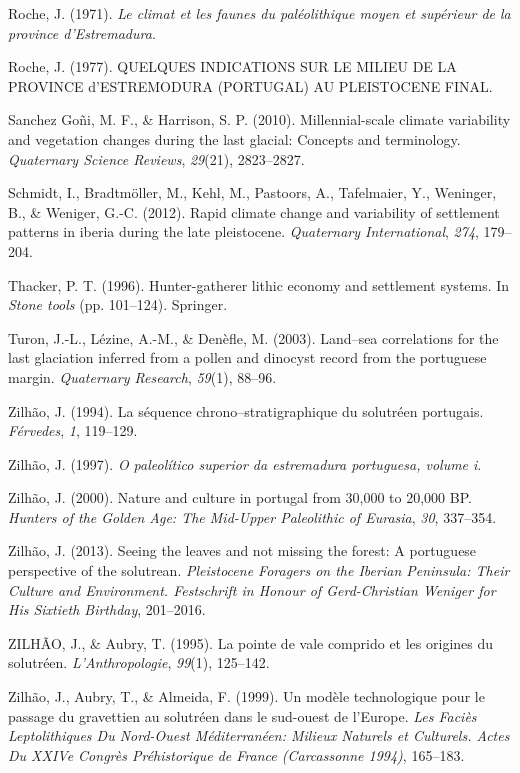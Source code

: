 \documentclass[12pt,twoside]{reedthesis}
\begin{document}
\leavevmode\hypertarget{ref-roche1971}{}%
Roche, J. (1971). \emph{Le climat et les faunes du paléolithique moyen et supérieur de la province d'Estremadura}.

\leavevmode\hypertarget{ref-roche1977}{}%
Roche, J. (1977). QUELQUES INDICATIONS SUR LE MILIEU DE LA PROVINCE d'ESTREMODURA (PORTUGAL) AU PLEISTOCENE FINAL.

\leavevmode\hypertarget{ref-sanchez-goni2010}{}%
Sanchez Goñi, M. F., \& Harrison, S. P. (2010). Millennial-scale climate variability and vegetation changes during the last glacial: Concepts and terminology. \emph{Quaternary Science Reviews}, \emph{29}(21), 2823--2827.

\leavevmode\hypertarget{ref-schmidt2012}{}%
Schmidt, I., Bradtmöller, M., Kehl, M., Pastoors, A., Tafelmaier, Y., Weninger, B., \& Weniger, G.-C. (2012). Rapid climate change and variability of settlement patterns in iberia during the late pleistocene. \emph{Quaternary International}, \emph{274}, 179--204.

\leavevmode\hypertarget{ref-thacker1996}{}%
Thacker, P. T. (1996). Hunter-gatherer lithic economy and settlement systems. In \emph{Stone tools} (pp. 101--124). Springer.

\leavevmode\hypertarget{ref-turon2003}{}%
Turon, J.-L., Lézine, A.-M., \& Denèfle, M. (2003). Land--sea correlations for the last glaciation inferred from a pollen and dinocyst record from the portuguese margin. \emph{Quaternary Research}, \emph{59}(1), 88--96.

\leavevmode\hypertarget{ref-zilhao1994}{}%
Zilhão, J. (1994). La séquence chrono--stratigraphique du solutréen portugais. \emph{Férvedes}, \emph{1}, 119--129.

\leavevmode\hypertarget{ref-zilhao1997}{}%
Zilhão, J. (1997). \emph{O paleolítico superior da estremadura portuguesa, volume i}.

\leavevmode\hypertarget{ref-zilhao2000}{}%
Zilhão, J. (2000). Nature and culture in portugal from 30,000 to 20,000 BP. \emph{Hunters of the Golden Age: The Mid-Upper Paleolithic of Eurasia}, \emph{30}, 337--354.

\leavevmode\hypertarget{ref-zilhao2013}{}%
Zilhão, J. (2013). Seeing the leaves and not missing the forest: A portuguese perspective of the solutrean. \emph{Pleistocene Foragers on the Iberian Peninsula: Their Culture and Environment. Festschrift in Honour of Gerd-Christian Weniger for His Sixtieth Birthday}, 201--2016.

\leavevmode\hypertarget{ref-zilhaoetal1995}{}%
ZILHÃO, J., \& Aubry, T. (1995). La pointe de vale comprido et les origines du solutréen. \emph{L'Anthropologie}, \emph{99}(1), 125--142.

\leavevmode\hypertarget{ref-zilhaoetal1999}{}%
Zilhão, J., Aubry, T., \& Almeida, F. (1999). Un modèle technologique pour le passage du gravettien au solutréen dans le sud-ouest de l'Europe. \emph{Les Faciès Leptolithiques Du Nord-Ouest Méditerranéen: Milieux Naturels et Culturels. Actes Du XXIVe Congrès Préhistorique de France (Carcassonne 1994)}, 165--183.


\end{document}
